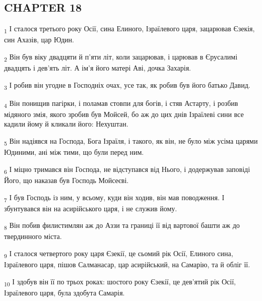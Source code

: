 \subsection{CHAPTER 18}
\begin{tcolorbox}
\textsubscript{1} І сталося третього року Осії, сина Елиного, Ізраїлевого царя, зацарював Єзекія, син Ахазів, цар Юдин.
\end{tcolorbox}
\begin{tcolorbox}
\textsubscript{2} Він був віку двадцяти й п'яти літ, коли зацарював, і царював в Єрусалимі двадцять і дев'ять літ. А ім'я його матері Аві, дочка Захарія.
\end{tcolorbox}
\begin{tcolorbox}
\textsubscript{3} І робив він угодне в Господніх очах, усе так, як робив був його батько Давид.
\end{tcolorbox}
\begin{tcolorbox}
\textsubscript{4} Він понищив пагірки, і поламав стовпи для богів, і стяв Астарту, і розбив мідяного змія, якого зробив був Мойсей, бо аж до цих днів Ізраїлеві сини все кадили йому й кликали його: Нехуштан.
\end{tcolorbox}
\begin{tcolorbox}
\textsubscript{5} Він надіявся на Господа, Бога Ізраїля, і такого, як він, не було між усіма царями Юдиними, ані між тими, що були перед ним.
\end{tcolorbox}
\begin{tcolorbox}
\textsubscript{6} І міцно тримався він Господа, не відступався від Нього, і додержував заповіді Його, що наказав був Господь Мойсеєві.
\end{tcolorbox}
\begin{tcolorbox}
\textsubscript{7} І був Господь із ним, у всьому, куди він ходив, він мав поводження. І збунтувався він на асирійського царя, і не служив йому.
\end{tcolorbox}
\begin{tcolorbox}
\textsubscript{8} Він побив филистимлян аж до Аззи та границі її від вартової башти аж до твердинного міста.
\end{tcolorbox}
\begin{tcolorbox}
\textsubscript{9} І сталося четвертого року царя Єзекії, це сьомий рік Осії, Елиного сина, Ізраїлевого царя, пішов Салманасар, цар асирійський, на Самарію, та й обліг її.
\end{tcolorbox}
\begin{tcolorbox}
\textsubscript{10} І здобув він її по трьох роках: шостого року Єзекії, це дев'ятий рік Осії, Ізраїлевого царя, була здобута Самарія.
\end{tcolorbox}
